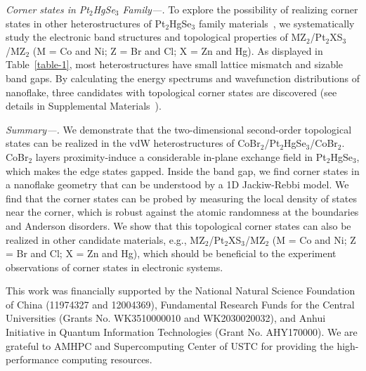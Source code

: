\documentclass[aps,prl,twocolumn,showpacs,superscriptaddress]{revtex4-1}
\begin{document}
\textit{Corner states in Pt$_2$HgSe$_3$ Family---.} To explore the possibility of realizing corner states in other heterostructures of Pt$_2$HgSe$_3$ family materials~\cite{DFT_PHS2,2020_Lima,2020_Ma}, we systematically study the electronic band structures and topological properties of MZ$_2$/Pt$_2$XS$_3$/MZ$_2$ (M = Co and Ni; Z = Br and Cl; X = Zn and Hg). As displayed in Table~\ref{table-1}, most heterostructures have small lattice mismatch and sizable band gaps. By calculating the energy spectrums and wavefunction distributions of nanoflake, three candidates with topological corner states are discovered (see details in Supplemental Materials~\cite{SM}).

\textit{Summary---.} We demonstrate that the two-dimensional second-order topological states can be realized in the vdW heterostructures of CoBr$_2$/Pt$_2$HgSe$_3$/CoBr$_2$. CoBr$_2$ layers proximity-induce a considerable in-plane exchange field in Pt$_2$HgSe$_3$, which makes the edge states gapped. Inside the band gap, we find corner states in a nanoflake geometry that can be understood by a 1D Jackiw-Rebbi model. We find that the corner states can be probed by measuring the local density of states near the corner, which is robust against the atomic randomness at the boundaries and Anderson disorders. We show that this topological corner states can also be realized in other candidate materials, e.g., MZ$_2$/Pt$_2$XS$_3$/MZ$_2$ (M = Co and Ni; Z = Br and Cl; X = Zn and Hg), which should be beneficial to the experiment observations of corner states in electronic systems.

\begin{acknowledgments}
This work was financially supported by the National Natural Science Foundation of China (11974327 and 12004369), Fundamental Research Funds for the Central Universities (Grants No. WK3510000010 and WK2030020032), and Anhui Initiative in Quantum Information Technologies (Grant No. AHY170000). We are grateful to AMHPC and Supercomputing Center of USTC for providing the high-performance computing resources.
\end{acknowledgments}
\end{document}
